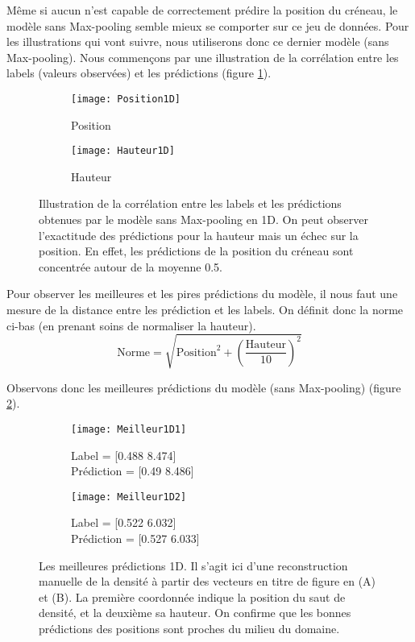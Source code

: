     Même si aucun n'est capable de correctement prédire la position du créneau, le modèle sans Max-pooling semble mieux se comporter sur ce jeu de données. Pour les illustrations qui vont suivre, nous utiliserons donc ce dernier modèle (sans Max-pooling). Nous commençons par une illustration de la corrélation entre les labels (valeurs observées) et les prédictions (figure \ref{fig:Illustration1D}).
    
    \begin{figure}[!h]
    \begin{subfigure}{.5\textwidth}
    \centering
    \texttt{[image: Position1D]}  
    \caption[Pos1D]{Position}
    \end{subfigure}
    \begin{subfigure}{.5\textwidth}
    \centering
    \texttt{[image: Hauteur1D]}  
    \caption[H1D]{Hauteur}
    \end{subfigure}
    
     \centering
    \decoRule
    \caption[Illustration 1D]{Illustration de la corrélation entre les labels et les prédictions obtenues par le modèle sans Max-pooling en 1D. On peut observer l'exactitude des prédictions pour la hauteur mais un échec sur la position. En effet, les prédictions de la position du créneau sont concentrée autour de la moyenne 0.5.}
    \label{fig:Illustration1D}
    \end{figure}

    Pour observer les meilleures et les pires prédictions du modèle, il nous faut une mesure de la distance entre les prédiction et les labels. On définit donc la norme ci-bas (en prenant soins de normaliser la hauteur). $$ \text{Norme} = \sqrt{\text{Position}^2 + \left( \frac{\text{Hauteur}}{10} \right)^2}$$
    
    Observons donc les meilleures prédictions du modèle (sans Max-pooling) (figure \ref{fig:Meilleur1D}).
    \begin{figure}[!h]
    \begin{subfigure}{.5\textwidth}
    \centering
    \texttt{[image: Meilleur1D1]}  
    \caption[Meilleur1D1]{Label = [0.488 8.474] \\ Prédiction = [0.49  8.486]}
    \end{subfigure}
    \begin{subfigure}{.5\textwidth}
    \centering
    \texttt{[image: Meilleur1D2]}  
    \caption[Meilleur1D2]{Label = [0.522 6.032]  \\ Prédiction = [0.527 6.033]}
    \end{subfigure}
    
     \centering
    \decoRule
    \caption[Meilleur 1D]{Les meilleures prédictions 1D. Il s'agit ici d'une reconstruction manuelle de la densité à partir des vecteurs en titre de figure en (A) et (B). La première coordonnée indique la position du saut de densité, et la deuxième sa hauteur. On confirme que les bonnes prédictions des positions sont proches du milieu du domaine.}
    \label{fig:Meilleur1D}
    \end{figure}
    
